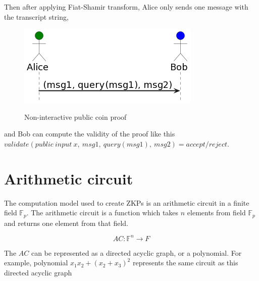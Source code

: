 Then after applying Fiat-Shamir transform, Alice only sends one message with
the transcript string,
\begin{figure}[h]
    \centering
    \includegraphics[scale=0.6]{assets/images/non_interactive_coin.png}
    \caption{Non-interactive public coin proof}
    \label{fig:non_interactive_coin}
	\cite{Fiat, youtubeMOOCLecture1}
    \vspace{0.5cm}
\end{figure}
and Bob can compute the validity of the proof like this
$validate(public\:input\:x,\:msg1,\:query(msg1),\:msg2) = accept/reject$.

\section{Arithmetic circuit}

The computation model used to create ZKPs is an arithmetic circuit in a
finite field $\mathbb{F}_p$. The arithmetic circuit is a function which takes
$n$ elements from field $\mathbb{F}_p$ and returns one element from that field.

\[AC: \mathbb{F}^n \rightarrow F \]

The $AC$ can be represented as a directed acyclic graph, or a polynomial. For
example, polynomial $x_1x_2 + (x_2 + x_3)^2$ represents the same circuit as this
directed acyclic graph

